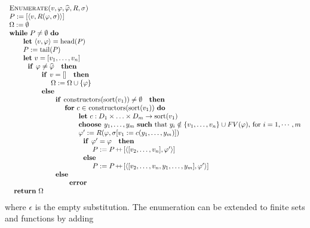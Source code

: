 \documentclass{article}
\providecommand{\concat}{\ensuremath{\hspace{0.12em}\raisebox{0.2ex}{\text{\scriptsize+}\!\text{\scriptsize+}}\hspace{0.12em}}}
\begin{document}
\bigskip 
\[
\begin{tabular}{l}
\textsc{Enumerate(}$v,\varphi ,\widehat{\varphi },R,\sigma $\textsc{)} \\ 
$P:=[\left\langle v,R(\varphi ,\sigma )\right\rangle ]$ \\ 
$\Omega :=\emptyset $ \\ 
\textbf{while} $P\neq \emptyset $ \textbf{do} \\ 
\qquad \textbf{let} $\left\langle v,\varphi \right\rangle =\mathrm{head}(P)$
\\ 
\qquad $P:=\mathrm{tail}(P)$ \\ 
\qquad \textbf{let} $v=[v_{1},\ldots ,v_{n}]$ \\ 
\qquad $\text{\textbf{if }}\varphi \neq \widehat{\varphi }\text{ \textbf{then%
}}$ \\ 
\qquad \qquad $\text{\textbf{if }}v=[]\text{ \textbf{then}}$ \\ 
\qquad \qquad \qquad $\Omega :=\Omega \cup \left\{ \varphi \right\} $ \\ 
\qquad \qquad $\text{\textbf{else}}$ \\ 
\qquad \qquad \qquad $\text{\textbf{if }}\mathrm{constructors}(\mathrm{sort}%
(v_{1}))\neq \emptyset \text{ \textbf{then}}$ \\ 
\qquad \qquad \qquad \qquad \textbf{for} $c\in $ $\mathrm{constructors}(%
\mathrm{sort}(v_{1}))$ \textbf{do} \\ 
\qquad \qquad \qquad \qquad \qquad \textbf{let} $c:D_{1}\times \ldots \times
D_{m}\rightarrow \mathrm{sort}(v_{1})$ \\ 
\qquad \qquad \qquad \qquad \qquad \textbf{choose }$y_{1},\ldots ,y_{m}$ 
\textbf{such} that $y_{i}\notin \{v_{1},\ldots ,v_{n}\}\cup FV(\varphi )$,
for $i=1,\cdots ,m$ \\ 
\qquad \qquad \qquad \qquad \qquad $\varphi ^{\prime }:=R(\varphi ,\sigma
\lbrack v_{1}:=c(y_{1},\ldots ,y_{m})])$ \\ 
\qquad \qquad \qquad \qquad \qquad $\text{\textbf{if }}\varphi ^{\prime
}=\varphi \text{ \textbf{then}}$ \\ 
\qquad \qquad \qquad \qquad \qquad \qquad $P:=P\concat\lbrack \left\langle
[v_{2},\ldots ,v_{n}],\varphi ^{\prime }\right\rangle ]$ \\ 
\qquad \qquad \qquad \qquad \qquad $\text{\textbf{else}}$ \\ 
\qquad \qquad \qquad \qquad \qquad \qquad $P:=P\concat\lbrack \left\langle
[v_{2},\ldots ,v_{n},y_{1},\ldots ,y_{m}],\varphi ^{\prime }\right\rangle ]$
\\ 
\qquad \qquad \qquad $\text{\textbf{else}}$ \\ 
\qquad \qquad \qquad \qquad $\text{\textbf{error}}$ \\ 
$\text{\textbf{return}}$ $\Omega $%
\end{tabular}%
\]%
where $\epsilon $ is the empty substitution. The enumeration can be extended
to finite sets and functions by adding
\end{document}
